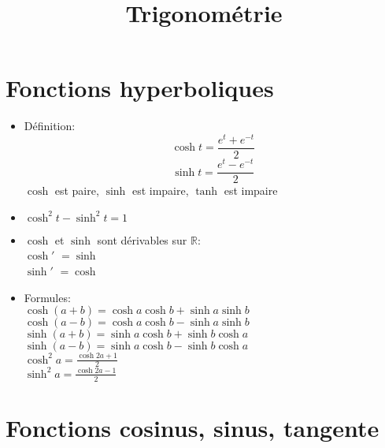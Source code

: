 \documentclass[fleqn]{article}
\title{Trigonom\'etrie}
\date{}
\begin{document}
\maketitle

\section{Fonctions hyperboliques}
\begin{itemize}
	\item D\'{e}finition:
		\[ \cosh t = \frac{e^t + e^{-t}}{2} \]
		\[ \sinh t = \frac{e^t - e^{-t}}{2} \]
		$\cosh$ est paire, $\sinh$ est impaire, $\tanh$ est impaire
	\item $ \cosh^2 t - \sinh^2 t = 1 $
	\item $\cosh$ et $\sinh$ sont d\'{e}rivables sur $\mathbb{R}$: \\
		$\cosh'$ $ = \sinh$ \\
		$\sinh'$ $ = \cosh$
	\newline
	\item Formules: \\
		$\cosh (a+b) = \cosh a\cosh b + \sinh a\sinh b$ \\
		$\cosh (a-b) = \cosh a\cosh b - \sinh a\sinh b$ \\
		$\sinh (a+b) = \sinh a\cosh b + \sinh b\cosh a$ \\
		$\sinh (a-b) = \sinh a\cosh b - \sinh b\cosh a$ \\
		$\cosh^2 a = \frac{\cosh 2a + 1}{2}$ \\
		$\sinh^2 a = \frac{\cosh 2a - 1}{2}$
\end{itemize}

\section{Fonctions cosinus, sinus, tangente}
\end{document}
